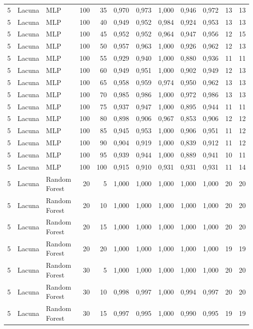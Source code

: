 \begin{longtable}{@{}rllrrrrrrrrr@{}}
5 & Lacuna & MLP & 100 & 35 & 0,970 & 0,973 & 1,000 & 0,946 & 0,972 & 13 & 13 \\
5 & Lacuna & MLP & 100 & 40 & 0,949 & 0,952 & 0,984 & 0,924 & 0,953 & 13 & 13 \\
5 & Lacuna & MLP & 100 & 45 & 0,952 & 0,952 & 0,964 & 0,947 & 0,956 & 12 & 15 \\
5 & Lacuna & MLP & 100 & 50 & 0,957 & 0,963 & 1,000 & 0,926 & 0,962 & 12 & 13 \\
5 & Lacuna & MLP & 100 & 55 & 0,929 & 0,940 & 1,000 & 0,880 & 0,936 & 11 & 11 \\
5 & Lacuna & MLP & 100 & 60 & 0,949 & 0,951 & 1,000 & 0,902 & 0,949 & 12 & 13 \\
5 & Lacuna & MLP & 100 & 65 & 0,958 & 0,959 & 0,974 & 0,950 & 0,962 & 13 & 13 \\
5 & Lacuna & MLP & 100 & 70 & 0,985 & 0,986 & 1,000 & 0,972 & 0,986 & 13 & 13 \\
5 & Lacuna & MLP & 100 & 75 & 0,937 & 0,947 & 1,000 & 0,895 & 0,944 & 11 & 11 \\
5 & Lacuna & MLP & 100 & 80 & 0,898 & 0,906 & 0,967 & 0,853 & 0,906 & 12 & 12 \\
5 & Lacuna & MLP & 100 & 85 & 0,945 & 0,953 & 1,000 & 0,906 & 0,951 & 11 & 12 \\
5 & Lacuna & MLP & 100 & 90 & 0,904 & 0,919 & 1,000 & 0,839 & 0,912 & 11 & 12 \\
5 & Lacuna & MLP & 100 & 95 & 0,939 & 0,944 & 1,000 & 0,889 & 0,941 & 10 & 11 \\
5 & Lacuna & MLP & 100 & 100 & 0,915 & 0,910 & 0,931 & 0,931 & 0,931 & 11 & 14 \\
5 & Lacuna & Random Forest & 20 & 5 & 1,000 & 1,000 & 1,000 & 1,000 & 1,000 & 20 & 20 \\
5 & Lacuna & Random Forest & 20 & 10 & 1,000 & 1,000 & 1,000 & 1,000 & 1,000 & 20 & 20 \\
5 & Lacuna & Random Forest & 20 & 15 & 1,000 & 1,000 & 1,000 & 1,000 & 1,000 & 20 & 20 \\
5 & Lacuna & Random Forest & 20 & 20 & 1,000 & 1,000 & 1,000 & 1,000 & 1,000 & 19 & 19 \\
5 & Lacuna & Random Forest & 30 & 5 & 1,000 & 1,000 & 1,000 & 1,000 & 1,000 & 20 & 20 \\
5 & Lacuna & Random Forest & 30 & 10 & 0,998 & 0,997 & 1,000 & 0,994 & 0,997 & 20 & 20 \\
5 & Lacuna & Random Forest & 30 & 15 & 0,997 & 0,995 & 1,000 & 0,990 & 0,995 & 19 & 19 \\

\end{longtable}
